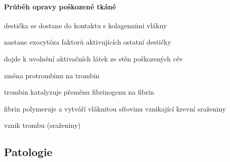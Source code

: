\documentclass[DIV=8]{scrreprt}
\begin{document}
\paragraph{Průběh opravy poškozené tkáně}
\begin{myEnumerate}[nosep]
    \item destička se dostane do kontaktu s kolagenními vlákny
    \item nastane exocytóza faktorů aktivujících ostatní destičky
    \item dojde k uvolnění aktivačních látek ze stěn poškozených cév
\begin{myItemize}[nosep]
    \item změna protrombinu na trombin
\end{myItemize}

    \item trombin katalyzuje přeměnu fibrinogenu na fibrin
    \item fibrin polymeruje a vytváří vláknitou síťovinu vznikající krevní sraženiny
    \item vznik trombu (sraženiny)
\end{myEnumerate}



\subsection{Patologie} \label{Patologie}
\end{document}

